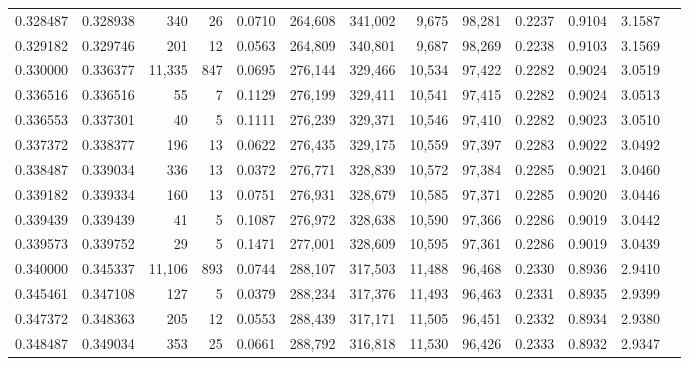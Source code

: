\begin{tabular}{rrrrrrrrrrrrr}
0.328487 & 0.328938 &    340 &    26 &                                     0.0710 & 264,608 & 341,002 &   9,675 &  98,281 & 0.2237 & 0.9104 & 3.1587 \\
0.329182 & 0.329746 &    201 &    12 &                                     0.0563 & 264,809 & 340,801 &   9,687 &  98,269 & 0.2238 & 0.9103 & 3.1569 \\
0.330000 & 0.336377 & 11,335 &   847 &                                     0.0695 & 276,144 & 329,466 &  10,534 &  97,422 & 0.2282 & 0.9024 & 3.0519 \\
0.336516 & 0.336516 &     55 &     7 &                                     0.1129 & 276,199 & 329,411 &  10,541 &  97,415 & 0.2282 & 0.9024 & 3.0513 \\
0.336553 & 0.337301 &     40 &     5 &                                     0.1111 & 276,239 & 329,371 &  10,546 &  97,410 & 0.2282 & 0.9023 & 3.0510 \\
0.337372 & 0.338377 &    196 &    13 &                                     0.0622 & 276,435 & 329,175 &  10,559 &  97,397 & 0.2283 & 0.9022 & 3.0492 \\
0.338487 & 0.339034 &    336 &    13 &                                     0.0372 & 276,771 & 328,839 &  10,572 &  97,384 & 0.2285 & 0.9021 & 3.0460 \\
0.339182 & 0.339334 &    160 &    13 &                                     0.0751 & 276,931 & 328,679 &  10,585 &  97,371 & 0.2285 & 0.9020 & 3.0446 \\
0.339439 & 0.339439 &     41 &     5 &                                     0.1087 & 276,972 & 328,638 &  10,590 &  97,366 & 0.2286 & 0.9019 & 3.0442 \\
0.339573 & 0.339752 &     29 &     5 &                                     0.1471 & 277,001 & 328,609 &  10,595 &  97,361 & 0.2286 & 0.9019 & 3.0439 \\
0.340000 & 0.345337 & 11,106 &   893 &                                     0.0744 & 288,107 & 317,503 &  11,488 &  96,468 & 0.2330 & 0.8936 & 2.9410 \\
0.345461 & 0.347108 &    127 &     5 &                                     0.0379 & 288,234 & 317,376 &  11,493 &  96,463 & 0.2331 & 0.8935 & 2.9399 \\
0.347372 & 0.348363 &    205 &    12 &                                     0.0553 & 288,439 & 317,171 &  11,505 &  96,451 & 0.2332 & 0.8934 & 2.9380 \\
0.348487 & 0.349034 &    353 &    25 &                                     0.0661 & 288,792 & 316,818 &  11,530 &  96,426 & 0.2333 & 0.8932 & 2.9347 \\

\end{tabular}

